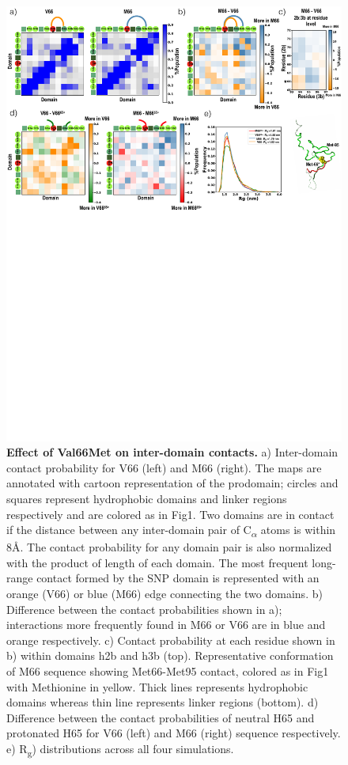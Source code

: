 \documentclass[journal=jacsat,manuscript=article]{achemso}
\begin{document}
\begin{figure}[!ht]
\includegraphics[scale=0.5,width=\textwidth,trim={0 0cm 0 0cm},clip]{../figures/fig-3.pdf}
\caption{{\bf Effect of Val66Met on inter-domain contacts.} a) Inter-domain contact probability for V66 (left) and M66 (right). The maps are annotated with cartoon representation of the prodomain; circles and squares represent hydrophobic domains and linker regions respectively and are colored as in Fig1. Two domains are in contact if the distance between any inter-domain pair of C\textsubscript{$\alpha$} atoms is within 8\AA. The contact probability for any domain pair is also normalized with the product of length of each domain. The most frequent long-range contact formed by the SNP domain is represented with an orange (V66) or blue (M66) edge connecting the two domains.  b) Difference between the contact probabilities shown in a); interactions more frequently found in M66 or V66 are in blue and orange respectively. c) Contact probability at each residue shown in b) within domains h2b and h3b (top). Representative conformation of M66 sequence showing Met66-Met95 contact, colored as in Fig1 with Methionine in yellow. Thick lines represents hydrophobic domains whereas thin line represents linker regions (bottom). d) Difference between the contact probabilities of neutral H65 and protonated H65 for V66 (left) and M66 (right) sequence respectively. e) R\textsubscript{g}) distributions across all four simulations.
 }
\label{fig4m}
\end{figure}
\end{document}

